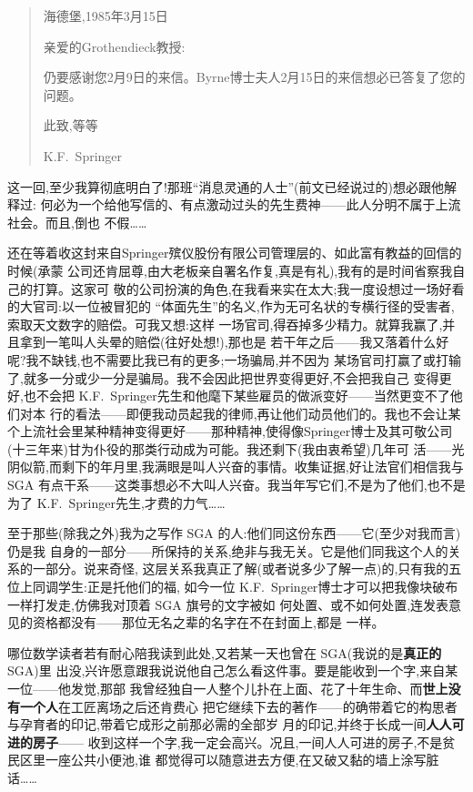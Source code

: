 \begin{quote}
海德堡,1985年3月15日

亲爱的Grothendieck教授:

仍要感谢您2月9日的来信。Byrne博士夫人2月15日的来信想必已答复了您的问题。

此致,等等

K.F.~Springer
\end{quote}

这一回,至少我算彻底明白了!那班“消息灵通的人士”(前文已经说过的)想必跟他解释过:
何必为一个给他写信的、有点激动过头的先生费神——此人分明不属于上流社会。而且,倒也
不假……

还在等着收这封来自Springer殡仪股份有限公司管理层的、如此富有教益的回信的时候(承蒙
公司还肯屈尊,由大老板亲自署名作复,真是有礼),我有的是时间省察我自己的打算。这家可
敬的公司扮演的角色,在我看来实在太大;我一度设想过一场好看的大官司:以一位被冒犯的
“体面先生”的名义,作为无可名状的专横行径的受害者,索取天文数字的赔偿。可我又想:这样
一场官司,得吞掉多少精力。就算我赢了,并且拿到一笔叫人头晕的赔偿(往好处想!),那也是
若干年之后——我又落着什么好呢?我不缺钱,也不需要比我已有的更多;一场骗局,并不因为
某场官司打赢了或打输了,就多一分或少一分是骗局。我不会因此把世界变得更好,不会把我自己
变得更好,也不会把 K.F.~Springer先生和他麾下\dmark{}某些雇员的做派变好——当然更变不了他们对本
行的看法——即便我动员起我的律师,再让他们动员他们的。我也不会让某个上流社会里某种精神变得更好——那种精神,使得像Springer博士及其可敬公司(十三年来)甘为仆役的那类行动成为可能。我还剩下(我由衷希望)几年可
活——光阴似箭,而剩下的年月里,我满眼是叫人兴奋的事情。收集证据,好让法官们相信我与
SGA 有点干系——这类事想必不大叫人兴奋。我当年写它们,不是为了他们,也不是为了 K.F.~Springer先生,才费的力气……

至于那些(除我之外)我为之写作 SGA 的人:他们同这份东西——它(至少对我而言)仍是我
自身的一部分——所保持的关系,绝非与我无关。它是他们同我这个人的关系的一部分。说来奇怪,
这层关系我真正了解(或者说多少了解一点)的,只有我的五位上同调学生:正是托他们的福,
如今一位 K.F.~Springer博士才可以把我像块破布一样打发走,仿佛我对顶着 SGA 旗号的文字被如
何处置、或不如何处置,连发表意见的资格都没有——那位无名之辈的名字在不在封面上,都是
一样。

哪位数学读者若有耐心陪我读到此处,又若某一天也曾在 SGA(我说的是\textbf{真正的} SGA)里
出没,兴许愿意跟我说说他自己怎么看这件事。要是能收到一个字,来自某一位——他发觉,那部
我曾经独自一人整个儿扑在上面、花了十年生命、而\textbf{世上没有一个人}在工匠离场之后还肯费心
把它继续下去的著作——的确带着它的构思者与孕育者的印记,带着它成形之前那必需的全部岁
月的印记,并终于长成一间\textbf{人人可进的房子}——
收到这样一个字,我一定会高兴。况且,一间人人可进的房子,不是贫民区里一座公共小便池,谁
都觉得可以随意进去方便,在又破又黏的墙上涂写脏话……

